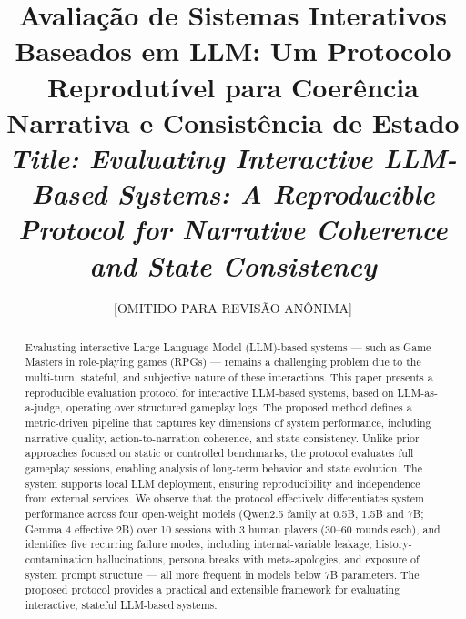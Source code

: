 \documentclass[12pt]{article}
\title{Avaliação de Sistemas Interativos Baseados em LLM: Um Protocolo Reprodutível para Coerência Narrativa e Consistência de Estado \\
\medskip
\small{
    \textit{Title: Evaluating Interactive LLM-Based Systems: A Reproducible Protocol for Narrative Coherence and State Consistency}
}
}
\author{[OMITIDO PARA REVISÃO ANÔNIMA]}
\begin{document}
\maketitle

\thispagestyle{plain}

\begin{abstract}
Evaluating interactive Large Language Model (LLM)-based systems --- such as Game Masters in role-playing games (RPGs) --- remains a challenging problem due to the multi-turn, stateful, and subjective nature of these interactions. This paper presents a reproducible evaluation protocol for interactive LLM-based systems, based on LLM-as-a-judge, operating over structured gameplay logs. The proposed method defines a metric-driven pipeline that captures key dimensions of system performance, including narrative quality, action-to-narration coherence, and state consistency. Unlike prior approaches focused on static or controlled benchmarks, the protocol evaluates full gameplay sessions, enabling analysis of long-term behavior and state evolution. The system supports local LLM deployment, ensuring reproducibility and independence from external services. We observe that the protocol effectively differentiates system performance across four open-weight models (Qwen2.5 family at 0.5B, 1.5B and 7B; Gemma 4 effective 2B) over 10 sessions with 3 human players (30--60 rounds each), and identifies five recurring failure modes, including internal-variable leakage, history-contamination hallucinations, persona breaks with meta-apologies, and exposure of system prompt structure --- all more frequent in models below 7B parameters. The proposed protocol provides a practical and extensible framework for evaluating interactive, stateful LLM-based systems.
\end{abstract}

\end{document}
